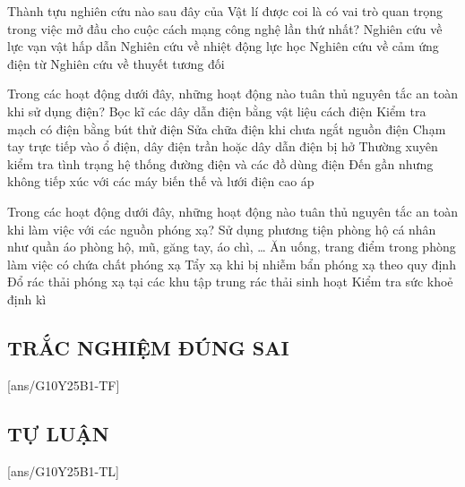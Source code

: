 \begin{ex}
	Thành tựu nghiên cứu nào sau đây của Vật lí được coi là có vai trò quan trọng trong việc mở đầu cho cuộc cách mạng công nghệ lần thứ nhất?
	\choice
	{Nghiên cứu về lực vạn vật hấp dẫn}
	{\True Nghiên cứu về nhiệt động lực học}
	{Nghiên cứu về cảm ứng điện từ}
	{Nghiên cứu về thuyết tương đối}
	\loigiai{}
\end{ex}
\begin{ex}
	Trong các hoạt động dưới đây, những hoạt động nào tuân thủ nguyên tắc an toàn khi sử dụng điện?
	\choice
	{Bọc kĩ các dây dẫn điện bằng vật liệu cách điện}
	{Kiểm tra mạch có điện bằng bút thử điện}
	{Sửa chữa điện khi chưa ngắt nguồn điện}
	{Chạm tay trực tiếp vào ổ điện, dây điện trần hoặc dây dẫn điện bị hở}
	{Thường xuyên kiểm tra tình trạng hệ thống đường điện và các đồ dùng điện}
	{Đến gần nhưng không tiếp xúc với các máy biến thế và lưới điện cao áp}
\end{ex}

\begin{ex}
	Trong các hoạt động dưới đây, những hoạt động nào tuân thủ nguyên tắc an toàn khi làm việc với các nguồn phóng xạ?
	\choice
	{Sử dụng phương tiện phòng hộ cá nhân như quần áo phòng hộ, mũ, găng tay, áo chì, \dots}
	{Ăn uống, trang điểm trong phòng làm việc có chứa chất phóng xạ}
	{Tẩy xạ khi bị nhiễm bẩn phóng xạ theo quy định}
	{Đổ rác thải phóng xạ tại các khu tập trung rác thải sinh hoạt}
	{Kiểm tra sức khoẻ định kì}
\end{ex}
\subsection{TRẮC NGHIỆM ĐÚNG SAI}
\setcounter{ex}{0}
[ans/G10Y25B1-TF]
\begin{ex}
	
	\choiceTF[t]
	{}
	{}
	{}
	{}
	\loigiai{}
\end{ex}
\subsection{TỰ LUẬN}
\setcounter{ex}{0}
[ans/G10Y25B1-TL]


